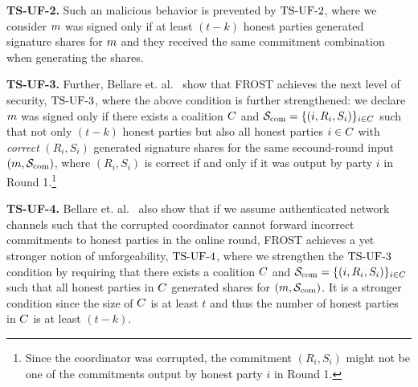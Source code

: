 
\medskip

\textbf{TS-UF-2.}
Such an malicious behavior is prevented by $\mathrm{TS}\mbox{-}\mathrm{UF}\mbox{-}{2}$, where
we consider $m$ was signed only if at least $(t - k)$ honest parties generated signature shares for $m$ and they received the same commitment combination when generating the shares.

\medskip

\textbf{TS-UF-3.} Further, Bellare et. al.~\cite{BellareCKMTZ22} show that FROST achieves the next level of security, $\mathrm{TS}\mbox{-}\mathrm{UF}\mbox{-}{3}$, where the above condition is further strengthened:
we declare $m$ was signed only if there exists a coalition $C$ and $\mathcal{S}_{\rm com}=\{ (i, R_{i}, S_{i})\}_{i \in C}$ such that not only $(t - k)$ honest parties but also all honest parties $i\in C$ with \emph{correct} $(R_{i}, S_{i})$ generated signature shares for the same secound-round input $(m, \mathcal{S}_{\rm com})$, where $(R_{i}, S_{i})$ is correct if and only if it was output by party $i$ in Round 1.\footnote{Since the coordinator was corrupted, the commitment $(R_{i}, S_{i})$ might not be one of the commitments output by honest party $i$ in Round 1.}


\medskip

\textbf{TS-UF-4.} Bellare et. al.~\cite{BellareCKMTZ22} also show that if we assume authenticated network channels such that the corrupted coordinator cannot forward incorrect commitments to honest parties in the online round, FROST achieves a yet stronger notion of unforgeability, $\mathrm{TS}\mbox{-}\mathrm{UF}\mbox{-}{4}$, where we strengthen the $\mathrm{TS}\mbox{-}\mathrm{UF}\mbox{-}{3}$ condition by requiring that there exists a coalition $C$ and $\mathcal{S}_{\rm com}=\{ (i, R_{i}, S_{i})\}_{i \in C}$ such that all honest parties in $C$ generated shares for $(m, \mathcal{S}_{\rm com})$.
It is a stronger condition since the size of $C$ is at least $t$ and thus the number of honest parties in $C$ is at least $(t - k)$.

